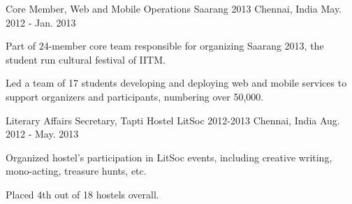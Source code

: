 \begin{cventries}
	\cventry
	{Core Member, Web and Mobile Operations}
	{Saarang 2013}
	{Chennai, India}
	{May. 2012 - Jan. 2013}
	{
		\begin{cvitems}
		\item{Part of 24-member core team responsible for organizing Saarang 2013, the student run cultural festival of IITM.}
		\item{Led a team of 17 students developing and deploying web and mobile services to support organizers and participants, numbering over 50,000.}
		\end{cvitems}
	}

	\cventry
	{Literary Affairs Secretary, Tapti Hostel}
	{LitSoc 2012-2013}
	{Chennai, India}
	{Aug. 2012 - May. 2013}
	{
		\begin{cvitems}
		\item{Organized hostel's participation in LitSoc events, including creative writing, mono-acting, treasure hunts, etc.}
		\item{Placed 4th out of 18 hostels overall.}
		\end{cvitems}
	}

\end{cventries}
